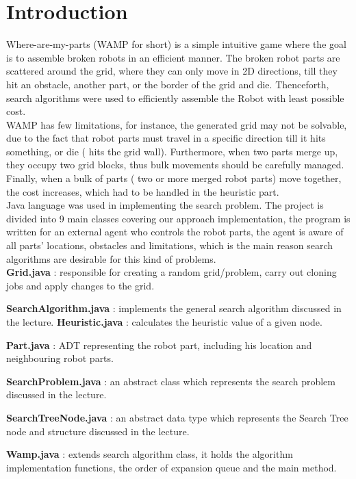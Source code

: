\chapter{Introduction}
Where-are-my-parts (WAMP for short) is a simple intuitive game where the goal is to assemble broken robots in an efficient manner. The broken robot parts are scattered around the grid, where they can only move in 2D directions, till they hit an obstacle, another part, or the border of the grid and die. Thenceforth, search algorithms were used to efficiently assemble the Robot with least possible cost. \\

WAMP has few limitations, for instance, the generated grid may not be solvable, due to the fact that robot parts must travel in a specific direction till it hits something, or die ( hits the grid wall). Furthermore, when two parts merge up, they occupy two grid blocks, thus bulk movements should be carefully managed. Finally, when a bulk of parts ( two or more merged robot parts) move together, the cost increases, which had to be handled in the heuristic part.\\

Java language was used in implementing the search problem. The project is divided into 9 main classes covering our approach implementation, the program is written for an external agent who controls the robot parts, the agent is aware of all parts' locations, obstacles and limitations, which is the main reason search algorithms are desirable for this kind of problems.\\

\textbf{Grid.java} : responsible for creating a random grid/problem, carry out cloning jobs and apply changes to the grid.

\textbf{SearchAlgorithm.java} : implements the general search algorithm discussed in the lecture.
\textbf{Heuristic.java }: calculates the heuristic value of a given node.

\textbf{Part.java} : ADT representing the robot part, including his location and neighbouring robot parts.

\textbf{SearchProblem.java} : an abstract class which represents the search problem discussed in the lecture.

\textbf{SearchTreeNode.java} : an abstract data type which represents the Search Tree node and structure discussed in the lecture. 

\textbf{Wamp.java} : extends search algorithm class, it holds the algorithm implementation functions, the order of expansion queue and the main method.

